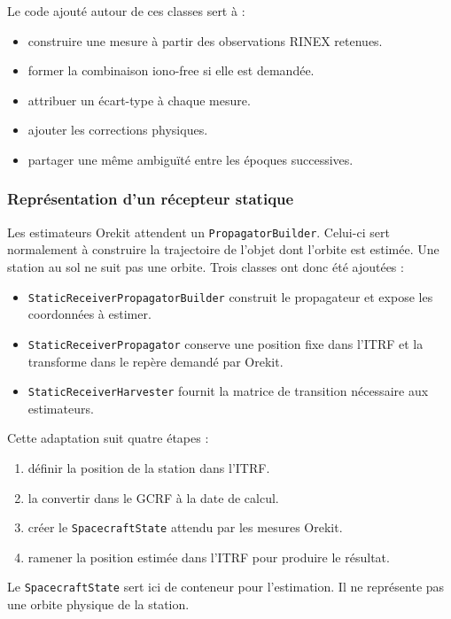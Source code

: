 Le code ajouté autour de ces classes sert à :

\begin{itemize}
    \item construire une mesure à partir des observations RINEX retenues.
    \item former la combinaison iono-free si elle est demandée.
    \item attribuer un écart-type à chaque mesure.
    \item ajouter les corrections physiques.
    \item partager une même ambiguïté entre les époques successives.
\end{itemize}

\subsubsection{Représentation d'un récepteur statique}

Les estimateurs Orekit attendent un \texttt{PropagatorBuilder}. Celui-ci sert
normalement à construire la trajectoire de l'objet dont l'orbite est estimée.
Une station au sol ne suit pas une orbite. Trois classes ont donc été ajoutées :

\begin{itemize}
    \item \texttt{StaticReceiverPropagatorBuilder} construit le propagateur et
    expose les coordonnées à estimer.
    \item \texttt{StaticReceiverPropagator} conserve une position fixe dans
    l'ITRF et la transforme dans le repère demandé par Orekit.
    \item \texttt{StaticReceiverHarvester} fournit la matrice de transition
    nécessaire aux estimateurs.
\end{itemize}

Cette adaptation suit quatre étapes :

\begin{enumerate}
    \item définir la position de la station dans l'ITRF.
    \item la convertir dans le GCRF à la date de calcul.
    \item créer le \texttt{SpacecraftState} attendu par les mesures Orekit.
    \item ramener la position estimée dans l'ITRF pour produire le résultat.
\end{enumerate}

Le \texttt{SpacecraftState} sert ici de conteneur pour l'estimation. Il ne
représente pas une orbite physique de la station.

